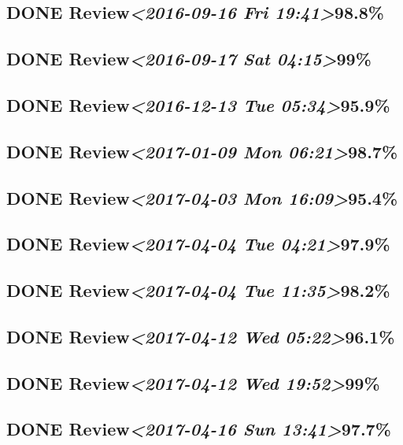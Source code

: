 \documentclass[11pt]{ctexart}
\begin{document}
\subsection{{\bfseries\sffamily DONE} Review\textit{<2016-09-16 Fri 19:41>}98.8\%}
\label{sec:org28e5469}
\subsection{{\bfseries\sffamily DONE} Review\textit{<2016-09-17 Sat 04:15>}99\%}
\label{sec:org24bf647}
\subsection{{\bfseries\sffamily DONE} Review\textit{<2016-12-13 Tue 05:34>}95.9\%}
\label{sec:orgfd3e374}
\subsection{{\bfseries\sffamily DONE} Review\textit{<2017-01-09 Mon 06:21>}98.7\%}
\label{sec:orgbfef8f1}
\subsection{{\bfseries\sffamily DONE} Review\textit{<2017-04-03 Mon 16:09>}95.4\%}
\label{sec:org0a316c5}
\subsection{{\bfseries\sffamily DONE} Review\textit{<2017-04-04 Tue 04:21>}97.9\%}
\label{sec:orgc3fa245}
\subsection{{\bfseries\sffamily DONE} Review\textit{<2017-04-04 Tue 11:35>}98.2\%}
\label{sec:org6cbf017}
\subsection{{\bfseries\sffamily DONE} Review\textit{<2017-04-12 Wed 05:22>}96.1\%}
\label{sec:org4bb1ccf}
\subsection{{\bfseries\sffamily DONE} Review\textit{<2017-04-12 Wed 19:52>}99\%}
\label{sec:org4940d4c}
\subsection{{\bfseries\sffamily DONE} Review\textit{<2017-04-16 Sun 13:41>}97.7\%}
\label{sec:orge2efe8b}
\end{document}
